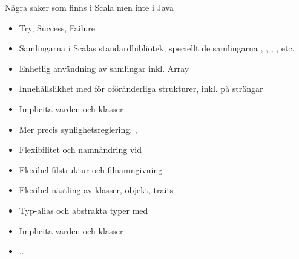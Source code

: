 \begin{Slide}{Några saker som finns i Scala men inte i Java}
\begin{multicols}{2}
\begin{itemize}
\item Try, Success, Failure

\item Samlingarna i Scalas standardbibliotek, speciellt de  samlingarna , , , , etc.

\item Enhetlig användning av samlingar inkl. Array

\item Innehållslikhet med \code{==} för oföränderliga strukturer, inkl. \code{< <= > >= } på strängar

\item Implicita värden och klasser

\item Mer precis synlighetsreglering, , 

\item Flexibilitet och namnändring vid  

\item Flexibel filstruktur och filnamngivning

\item Flexibel nästling av klasser, objekt, traits

\item Typ-alias och abstrakta typer med 

\item Implicita värden och klasser

\item ...
\end{itemize}
\end{multicols}
\end{Slide}


